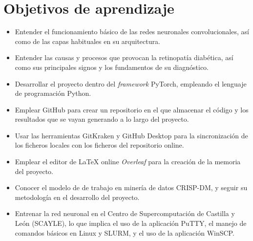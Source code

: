 \section{Objetivos de aprendizaje}
\begin{itemize}[itemsep=0.25em]
    \item Entender el funcionamiento básico de las redes neuronales convolucionales, así como de las capas habituales en su arquitectura.
    \item Entender las causas y procesos que provocan la retinopatía diabética, así como sus principales signos y los fundamentos de su diagnóstico.
    \item Desarrollar el proyecto dentro del \textit{framework} PyTorch, empleando el lenguaje de programación Python.
    \item Emplear GitHub para crear un repositorio en el que almacenar el código y los resultados que se vayan generando a lo largo del proyecto.
    \item Usar las herramientas GitKraken y GitHub Desktop para la sincronización de los ficheros locales con los ficheros del repositorio online. 
    \item Emplear el editor de LaTeX online \textit{Overleaf} para la creación de la memoria del proyecto.
    \item Conocer el modelo de de trabajo en minería de datos CRISP-DM, y seguir su metodología en el desarrollo del proyecto.
    \item Entrenar la red neuronal en el Centro de Supercomputación de Castilla y León (SCAYLE), lo que implica el uso de la aplicación PuTTY, el manejo de comandos básicos en Linux y SLURM, y el uso de la aplicación WinSCP.
\end{itemize}